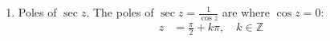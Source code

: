 \begin{enumerate}[label=\thesubsection.\arabic*, ref=\thesubsection.\theenumi]
\begin{align}
\\
&= \begin{cases} 2\pi \j, & n = -1 \\ 0, & n \ne -1 \end{cases}
\end{align}
\item Poles of $\sec z$. The poles of $\sec z = \frac{1}{\cos z}$ are where $\cos z = 0$:
\begin{align}
z &= \frac{\pi}{2} + k\pi, \quad k \in \mathbb{Z}
\label{eq:F-sec}
\end{align}
\end{enumerate}

